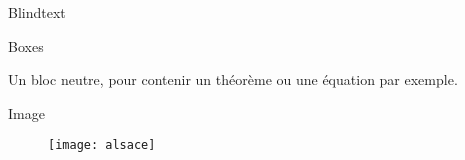 


\frame[plain]{\titlepage} 

\begin{frame}{Blindtext}
\blindtext
\end{frame}

\begin{frame}[allowframebreaks]{Boxes}
\begin{Information}
	\blindtext
\end{Information}

\begin{Question}
	\blindtext
\end{Question}

\begin{Warning}
	\blindtext
\end{Warning}

\begin{Error}
	\blindtext
\end{Error}

\begin{Information}
	\blindtext
\end{Information}

\begin{Neutral}
	Un bloc neutre, pour contenir un théorème ou une équation par exemple.
\end{Neutral}
\end{frame}

\begin{frame}{Image}
\begin{figure}[htbp]
\centering
\texttt{[image: alsace]}
\end{figure}
\end{frame}

